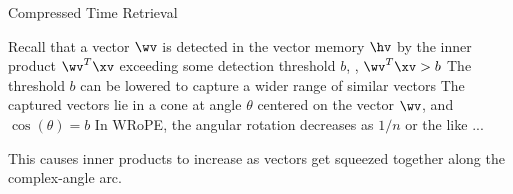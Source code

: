 \begin{slide}[\slideopts,toc={Compressed Time}]{Compressed Time Retrieval}

\begin{itemize}
  \mpitem Recall that a vector $\wv$ is detected in the vector memory $\hv$ by the inner product $\wv^T\xv$
  exceeding some detection threshold $b$, \ie, $\wv^T\xv > b$
  \mpitem The threshold $b$ can be lowered to capture a wider range of similar vectors
  \mpitem The captured vectors lie in a cone at angle $\theta$ centered on the vector $\wv$,
  and $\cos(\theta)=b$
  \mpitem In WRoPE, the angular rotation decreases as $1/n$ or the like
  \mpitem ...
\end{itemize}

This causes inner products to increase as vectors get squeezed together along the complex-angle arc.

\end{slide}

